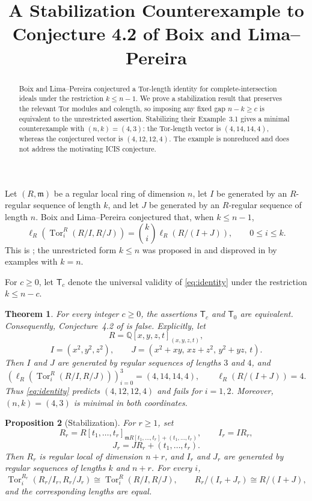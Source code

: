 \documentclass[11pt]{amsart}
\title[A stabilization counterexample]
{A Stabilization Counterexample to Conjecture 4.2 of
Boix and Lima--Pereira}
\date{}
\newtheorem{theorem}{Theorem}
\newtheorem{proposition}[theorem]{Proposition}
\theoremstyle{remark}
\newcommand{\Tor}{\operatorname{Tor}}
\newcommand{\m}{\mathfrak m}
\begin{document}
\begin{abstract}
Boix and Lima--Pereira conjectured a Tor-length identity for complete-intersection
ideals under the restriction $k\leq n-1$. We prove a stabilization result that
preserves the relevant Tor modules and colength, so imposing any fixed gap
$n-k\geq c$ is equivalent to the unrestricted assertion. Stabilizing their
Example~3.1 gives a minimal counterexample with $(n,k)=(4,3)$: the Tor-length
vector is $(4,14,14,4)$, whereas the conjectured vector is $(4,12,12,4)$. The
example is nonreduced and does not address the motivating ICIS conjecture.
\end{abstract}

\maketitle

Let $(R,\m)$ be a regular local ring of dimension $n$, let $I$ be generated by
an $R$-regular sequence of length $k$, and let $J$ be generated by an
$R$-regular sequence of length $n$. Boix and Lima--Pereira conjectured that,
when $k\leq n-1$,
\begin{equation}\label{eq:identity}
 \ell_R\!\left(\Tor_i^R(R/I,R/J)\right)
 =\binom{k}{i}\ell_R\!\left(R/(I+J)\right),
 \qquad 0\leq i\leq k.
\end{equation}
This is \cite[Conjecture~4.2]{BLP}; the unrestricted form $k\leq n$ was
proposed in \cite[Conjecture~4.9]{LPNOT} and disproved in
\cite[Section~3]{BLP} by examples with $k=n$.

For $c\geq0$, let $\mathsf T_c$ denote the universal validity of
\eqref{eq:identity} under the restriction $k\leq n-c$.

\begin{theorem}\label{thm:main}
For every integer $c\geq0$, the assertions $\mathsf T_c$ and $\mathsf T_0$ are
equivalent. Consequently, Conjecture~4.2 of \cite{BLP} is false. Explicitly,
let
\[
 R=\mathbb Q[x,y,z,t]_{(x,y,z,t)},
\]
\[
 I=(x^2,y^2,z^2),\qquad
 J=(x^2+xy,\,xz+z^2,\,y^2+yz,\,t).
\]
Then $I$ and $J$ are generated by regular sequences of lengths $3$ and $4$,
and
\[
 \left(\ell_R\!\left(\Tor_i^R(R/I,R/J)\right)\right)_{i=0}^3
 =(4,14,14,4),
 \qquad
 \ell_R(R/(I+J))=4.
\]
Thus \eqref{eq:identity} predicts $(4,12,12,4)$ and fails for $i=1,2$.
Moreover, $(n,k)=(4,3)$ is minimal in both coordinates.
\end{theorem}

\newpage
\begin{proposition}[Stabilization]\label{prop:stabilization}
For $r\geq1$, set
\[
 R_r=R[t_1,\ldots,t_r]_{\m R[t_1,\ldots,t_r]+(t_1,\ldots,t_r)},
 \qquad I_r=IR_r,
\]
\[
 J_r=JR_r+(t_1,\ldots,t_r).
\]
Then $R_r$ is regular local of dimension $n+r$, and $I_r$ and $J_r$ are
generated by regular sequences of lengths $k$ and $n+r$. For every $i$,
\[
 \Tor_i^{R_r}(R_r/I_r,R_r/J_r)
 \cong \Tor_i^R(R/I,R/J),
 \qquad
 R_r/(I_r+J_r)\cong R/(I+J),
\]
and the corresponding lengths are equal.
\end{proposition}
\end{document}
